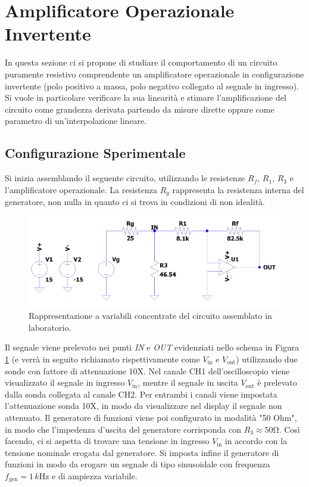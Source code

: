 \documentclass[a4paper,11pt]{article}
\begin{document}
\cleardoublepage




\section{Amplificatore Operazionale Invertente}
In questa sezione ci si propone di studiare il comportamento di un circuito puramente resistivo comprendente un
amplificatore operazionale in configurazione invertente (polo positivo a massa, polo negativo collegato al segnale in
ingresso). Si vuole in particolare verificare la sua linearità e stimare l'amplificazione del circuito come grandezza derivata
partendo da misure dirette oppure come parametro di un'interpolazione lineare. 

\subsection{Configurazione Sperimentale}

Si inizia assemblando il seguente circuito, utilizzando le resistenze $R_f$, $R_1$, $R_3$ e l'amplificatore
operazionale. La resistenza $R_g$ rappresenta la resistenza interna del generatore, non nulla in quanto ci si trova in
condizioni di non idealità. 

\begin{figure}[H]
	\centering
	\includegraphics[width=\linewidth]{../Simulations/OpAmp/circuit_image_nosim.png}
	\caption{Rappresentazione a variabili concentrate del circuito assemblato in laboratorio.}
	\label{i:opamp_circuit}
\end{figure}

\noindent Il segnale viene prelevato nei punti \textit{IN} e \textit{OUT} evidenziati nello schema in Figura
\ref{i:opamp_circuit} (e verrà in seguito richiamato rispettivamente come $V_{\text{in}}$ e $V_{\text{out}}$)
utilizzando due sonde con fattore di attenuazione 10X. Nel canale CH1 dell'oscilloscopio viene visualizzato il segnale
in ingresso $V_{\text{in}}$, mentre il segnale in uscita $V_{\text{out}}$ è prelevato dalla sonda collegata al canale
CH2. Per entrambi i canali viene impostata l'attenuazione sonda 10X, in modo da visualizzare nel display il segnale non
attenuato. Il generatore di funzioni viene poi configurato in modalità "50 Ohm", in modo che l'impedenza d'uscita del
generatore corrisponda con $R_3\approx 50\si{\ohm}$. Così facendo, ci si aspetta di trovare una tensione in ingresso
$V_{\text{in}}$ in accordo con la tensione nominale erogata dal generatore. Si imposta infine il generatore di funzioni
in modo da erogare un segnale di tipo sinusoidale con frequenza $f_{\text{gen}}=1\,\si{k\hertz}$ e di ampiezza
variabile.
\end{document}
